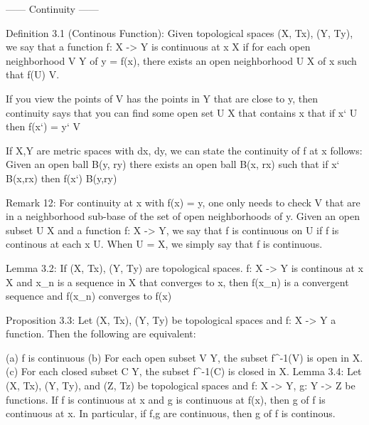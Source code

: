 ------ Continuity ------

Definition 3.1 (Continous Function):
    Given topological spaces (X, Tx), (Y, Ty), we say that a function
    f: X -> Y is continuous at x \in X if for each open neighborhood
    V \subset Y of y = f(x), there exists an open neighborhood
    U \subset X of x such that f(U) \subset V.

If you view the points of V has the points in Y that are close to y,
then continuity says that you can find some open set U \subset X
that contains x that if x` \in U then f(x`) = y` \in V

If X,Y are metric spaces with dx, dy, we can state the continuity of
f at x follows:
    Given an open ball B(y, ry) there exists an open ball B(x, rx)
    such that if x` \in B(x,rx) then f(x`) \in B(y,ry)

Remark 12:
    For continuity at x with f(x) = y, one only needs to check V 
    that are in a neighborhood sub-base of the set of open
    neighborhoods of y.
    Given an open subset U \subset X and a function f: X -> Y, we 
    say that f is continuous on U if f is continous at each x \in U.
    When U = X, we simply say that f is continuous.

Lemma 3.2:
    If (X, Tx), (Y, Ty) are topological spaces. f: X -> Y is 
    continous at x \in X and {x_n} is a sequence in X that converges
    to x, then {f(x_n)} is a convergent sequence and {f(x_n)} 
    converges to f(x)

Proposition 3.3:
    Let (X, Tx), (Y, Ty) be topological spaces and f: X -> Y a 
    function. Then the following are equivalent:

        (a) f is continuous
        (b) For each open subset V \subset Y, the subset f^-1(V) is
            open in X.
        (c) For each closed subset C \subset Y, the subset f^-1(C)
            is closed in X.
Lemma 3.4:
    Let (X, Tx), (Y, Ty), and (Z, Tz) be topological spaces and 
    f: X -> Y, g: Y -> Z be functions. If f is continuous at x and g
    is continuous at f(x), then g of f is continuous at x. In 
    particular, if f,g are continuous, then g of f is continous.
